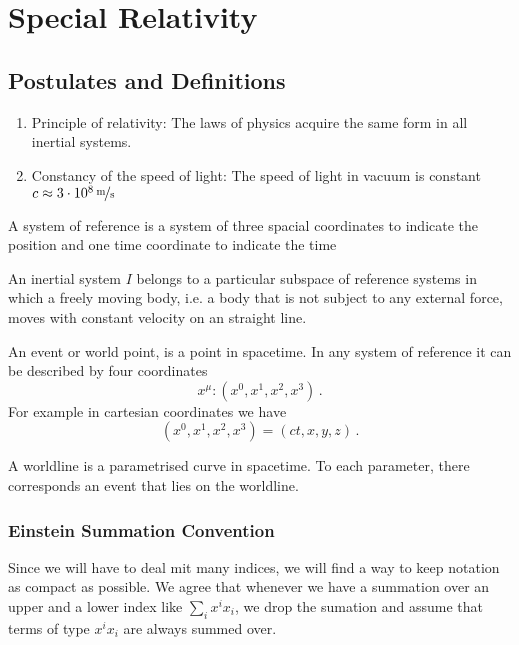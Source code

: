 \chapter{Special Relativity}
\section{Postulates and Definitions}
\begin{enumerate}
\item Principle of relativity: 
The laws of physics acquire the same form in all inertial systems.
\item Constancy of the speed of light:
The speed of light in vacuum is constant ${c\approx\unitfrac[3\cdot
10^8]{m}{s}}$
\end{enumerate}
\begin{definition}
A system of reference is a system of three spacial coordinates to indicate the
position and one time coordinate to indicate the time
\end{definition}
\begin{definition}
An inertial system $I$ belongs to a particular subspace of reference systems in
which a freely moving body, i.e. a body that is not subject to any external
force, moves with constant velocity on an straight line.
\end{definition}
\begin{definition}[Event]
An event or world point, is a point in spacetime. In any system of reference it
can be described by four coordinates 
\begin{equation}
x^\mu: (x^0,x^1,x^2,x^3)\, .
\end{equation}
For example in cartesian coordinates we have 
\begin{equation}
(x^0,x^1,x^2,x^3) = (ct,x,y,z)\, .
\end{equation}
\end{definition}
\begin{definition}[Worldline]
A worldline is a parametrised curve in spacetime. To each parameter, there
corresponds an event that lies on the worldline.
\end{definition}
\subsection{Einstein Summation Convention}
Since we will have to deal mit many indices, we will find a way to keep notation
as compact as possible. We agree that whenever we have a summation over an
upper and a lower index like $\sum_i x^ix_i$, we drop the sumation and assume
that terms of type $x^ix_i$ are always summed over.
